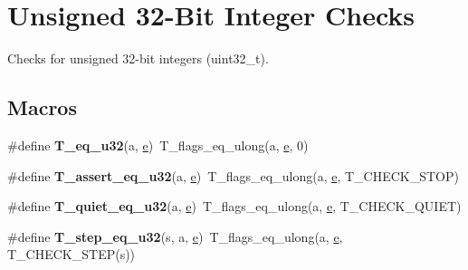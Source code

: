 \hypertarget{group__RTEMSTestFrameworkChecksUInt32}{}\section{Unsigned 32-\/Bit Integer Checks}
\label{group__RTEMSTestFrameworkChecksUInt32}


Checks for unsigned 32-\/bit integers (uint32\+\_\+t).  


\subsection*{Macros}
\begin{DoxyCompactItemize}
\item 
\mbox{\label{group__RTEMSTestFrameworkChecksUInt32_ga45d19274cf0054a47e109eaa27d82185}} 
\#define {\bfseries T\+\_\+eq\+\_\+u32}(a,  \mbox{\hyperlink{sun4u_2tte_8h_a8b0b9ed08e0e18920ec2682f48228c27}{e}})~T\+\_\+flags\+\_\+eq\+\_\+ulong(a, \mbox{\hyperlink{sun4u_2tte_8h_a8b0b9ed08e0e18920ec2682f48228c27}{e}}, 0)
\item 
\mbox{\label{group__RTEMSTestFrameworkChecksUInt32_ga7d9d453ce856397cf3f8b5f9da5bb78c}} 
\#define {\bfseries T\+\_\+assert\+\_\+eq\+\_\+u32}(a,  \mbox{\hyperlink{sun4u_2tte_8h_a8b0b9ed08e0e18920ec2682f48228c27}{e}})~T\+\_\+flags\+\_\+eq\+\_\+ulong(a, \mbox{\hyperlink{sun4u_2tte_8h_a8b0b9ed08e0e18920ec2682f48228c27}{e}}, T\+\_\+\+C\+H\+E\+C\+K\+\_\+\+S\+T\+OP)
\item 
\mbox{\label{group__RTEMSTestFrameworkChecksUInt32_ga9a0033acbe31b3c9fe65c04fa064c6b0}} 
\#define {\bfseries T\+\_\+quiet\+\_\+eq\+\_\+u32}(a,  \mbox{\hyperlink{sun4u_2tte_8h_a8b0b9ed08e0e18920ec2682f48228c27}{e}})~T\+\_\+flags\+\_\+eq\+\_\+ulong(a, \mbox{\hyperlink{sun4u_2tte_8h_a8b0b9ed08e0e18920ec2682f48228c27}{e}}, T\+\_\+\+C\+H\+E\+C\+K\+\_\+\+Q\+U\+I\+ET)
\item 
\mbox{\label{group__RTEMSTestFrameworkChecksUInt32_ga3a4f90addeb226785eb68798e353b6e6}} 
\#define {\bfseries T\+\_\+step\+\_\+eq\+\_\+u32}(s,  a,  \mbox{\hyperlink{sun4u_2tte_8h_a8b0b9ed08e0e18920ec2682f48228c27}{e}})~T\+\_\+flags\+\_\+eq\+\_\+ulong(a, \mbox{\hyperlink{sun4u_2tte_8h_a8b0b9ed08e0e18920ec2682f48228c27}{e}}, T\+\_\+\+C\+H\+E\+C\+K\+\_\+\+S\+T\+EP(s))

\end{DoxyCompactItemize}

